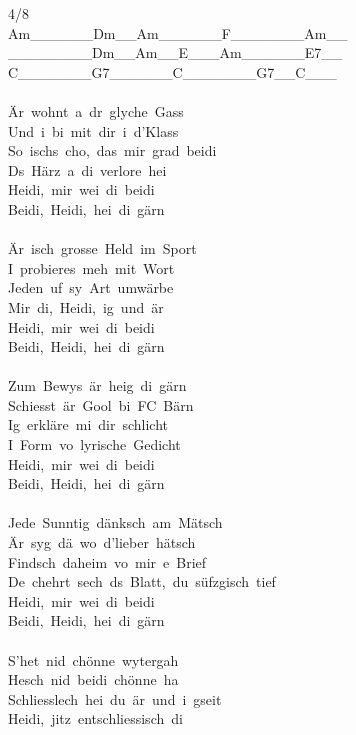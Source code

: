 \documentclass[]{book}
\begin{document}
4/8\\
\textbar Am\_\_\_\_\_\_\textbar Dm\_\_Am\_\_\textbar\_\_\_\_F\_\_\_\textbar\_\_\_\_Am\_\_\textbar{}\\
\textbar\_\_\_\_\_\_\_\_\textbar Dm\_\_Am\_\_\textbar E\_\_\_Am\_\_\textbar\_\_\_\_E7\_\_\textbar{}\\
\textbar C\_\_\_\_\_\_\_\textbar G7\_\_\_\_\_\_\textbar C\_\_\_\_\_\_\_\textbar G7\_\_C\_\_\_\textbar{}\\
~\\
Är~wohnt~a~dr~glyche~Gass\\
Und~i~bi~mit~dir~i~d'Klass\\
So~ischs~cho,~das~mir~grad~beidi\\
Ds~Härz~a~di~verlore~hei\\
Heidi,~mir~wei~di~beidi\\
Beidi,~Heidi,~hei~di~gärn\\
~\\
Är~isch~grosse~Held~im~Sport\\
I~probieres~meh~mit~Wort\\
Jeden~uf~sy~Art~umwärbe\\
Mir~di,~Heidi,~ig~und~är\\
Heidi,~mir~wei~di~beidi\\
Beidi,~Heidi,~hei~di~gärn\\
~\\
Zum~Bewys~är~heig~di~gärn\\
Schiesst~är~Gool~bi~FC~Bärn\\
Ig~erkläre~mi~dir~schlicht\\
I~Form~vo~lyrische~Gedicht\\
Heidi,~mir~wei~di~beidi\\
Beidi,~Heidi,~hei~di~gärn\\
~\\
Jede~Sunntig~dänksch~am~Mätsch\\
Är~syg~dä~wo~d'lieber~hätsch\\
Findsch~daheim~vo~mir~e~Brief\\
De~chehrt~sech~ds~Blatt,~du~süfzgisch~tief\\
Heidi,~mir~wei~di~beidi\\
Beidi,~Heidi,~hei~di~gärn\\
~\\
S'het~nid~chönne~wytergah\\
Hesch~nid~beidi~chönne~ha\\
Schliesslech~hei~du~är~und~i~gseit\\
Heidi,~jitz~entschliessisch~di\\
\end{document}
